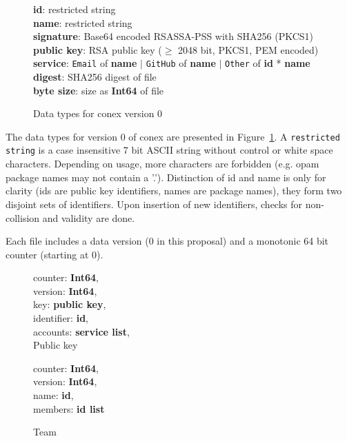 \documentclass[nocopyrightspace]{sigplanconf}
\begin{document}
\begin{figure}[h]
\textbf{id}: restricted string\\
\textbf{name}: restricted string\\
\textbf{signature}: Base64 encoded RSASSA-PSS with SHA256 (PKCS1)\\
\textbf{public key}: RSA public key ($\geq$ 2048 bit, PKCS1, PEM encoded)\\
\textbf{service}: \texttt{Email} of \textbf{name} $|$ \texttt{GitHub} of \textbf{name} $|$ \texttt{Other} of \textbf{id} * \textbf{name}\\
\textbf{digest}: SHA256 digest of file\\
\textbf{byte size}: size as \textbf{Int64} of file
\caption{\label{fig:datatypes0}
  Data types for conex version 0}
\end{figure}

The data types for version 0 of conex are presented in Figure~\ref{fig:datatypes0}.
A \texttt{restricted string} is a case insensitive 7 bit ASCII string without control or white space characters.
Depending on usage, more characters are forbidden (e.g. opam package names may not contain a '.').
Distinction of id and name is only for clarity (ids are public key identifiers, names are package names), they form two disjoint sets of identifiers.
Upon insertion of new identifiers, checks for non-collision and validity are done.

Each file includes a data version (0 in this proposal) and a monotonic 64 bit counter (starting at 0).

\begin{figure}[h]
  \begin{minipage}{\hsize}
    \begin{minipage}{.4 \hsize}
counter: \textbf{Int64},\\
version: \textbf{Int64},\\
key: \textbf{public key},\\
identifier: \textbf{id},\\
accounts: \textbf{service list},\\
 \caption{\label{fig:keyformat} Public key}
    \end{minipage}
    \hspace*{.5cm}
    \begin{minipage}{.4 \hsize}
counter: \textbf{Int64},\\
version: \textbf{Int64},\\
name: \textbf{id},\\
members: \textbf{id list}
 \caption{\label{fig:teamformat} Team}
    \end{minipage}
  \end{minipage}
\end{figure}
\end{document}
